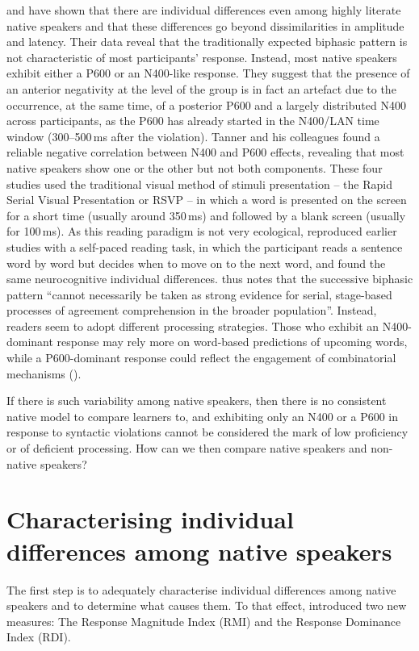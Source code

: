 \documentclass[output=paper,colorlinks,citecolor=brown,modfonts,nonflat]{../langscibook}
\begin{document}
\citet{Osterhout1997,TannerEtAl2013,TannerEtAl2014} and \citet{TannerHell2014} have shown that there are individual differences even among highly literate native speakers and that these differences go beyond dissimilarities in amplitude and latency. Their data reveal that the traditionally expected biphasic pattern is not characteristic of most participants’ response. Instead, most native speakers exhibit either a P600 or an N400-like response. They suggest that the presence of an anterior negativity at the level of the group is in fact an artefact due to the occurrence, at the same time, of a posterior P600 and a largely distributed N400 across participants, as the P600 has already started in the N400/LAN time window (300--500\,ms after the violation). Tanner and his colleagues found a reliable negative correlation between N400 and P600 effects, revealing that most native speakers show one or the other but not both components. These four studies used the traditional visual method of stimuli presentation – the Rapid Serial Visual Presentation or RSVP – in which a word is presented on the screen for a short time (usually around 350\,ms) and followed by a blank screen (usually for 100\,ms). As this reading paradigm is not very ecological, \citet{Tanner2019} reproduced earlier studies with a self-paced reading task, in which the participant reads a sentence word by word but decides when to move on to the next word, and found the same neurocognitive individual differences. \citet[232]{Tanner2019} thus notes that the successive biphasic pattern “cannot necessarily be taken as strong evidence for serial, stage-based processes of agreement comprehension in the broader population”. Instead, readers seem to adopt different processing strategies. Those who exhibit an N400-dominant response may rely more on word-based predictions of upcoming words, while a P600-dominant response could reflect the engagement of combinatorial mechanisms (\citealt{TannerHell2014}).

If there is such variability among native speakers, then there is no consistent native model to compare learners to, and exhibiting only an N400 or a P600 in response to syntactic violations cannot be considered the mark of low proficiency or of deficient processing. How can we then compare native speakers and non-native speakers? 

\section{Characterising individual differences among native speakers}
The first step is to adequately characterise individual differences among native speakers and to determine what causes them. To that effect, \citet{TannerEtAl2014} introduced two new measures: The Response Magnitude Index (RMI) and the Response Dominance Index (RDI). 
\end{document}

